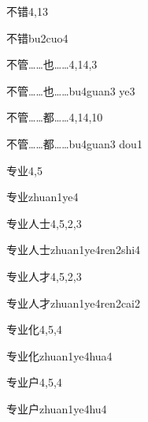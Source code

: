 \begin{entry}{不错}{4,13}
  \begin{phonetics}{不错}{bu2cuo4}
  \end{phonetics}
\end{entry}

\begin{entry}{不管……也……}{4,14,3}
  \begin{phonetics}{不管……也……}{bu4guan3 ye3}
  \end{phonetics}
\end{entry}

\begin{entry}{不管……都……}{4,14,10}
  \begin{phonetics}{不管……都……}{bu4guan3 dou1}
  \end{phonetics}
\end{entry}

\begin{entry}{专业}{4,5}
  \begin{phonetics}{专业}{zhuan1ye4}
  \end{phonetics}
\end{entry}

\begin{entry}{专业人士}{4,5,2,3}
  \begin{phonetics}{专业人士}{zhuan1ye4ren2shi4}
  \end{phonetics}
\end{entry}

\begin{entry}{专业人才}{4,5,2,3}
  \begin{phonetics}{专业人才}{zhuan1ye4ren2cai2}
  \end{phonetics}
\end{entry}

\begin{entry}{专业化}{4,5,4}
  \begin{phonetics}{专业化}{zhuan1ye4hua4}
  \end{phonetics}
\end{entry}

\begin{entry}{专业户}{4,5,4}
  \begin{phonetics}{专业户}{zhuan1ye4hu4}
  \end{phonetics}
\end{entry}


